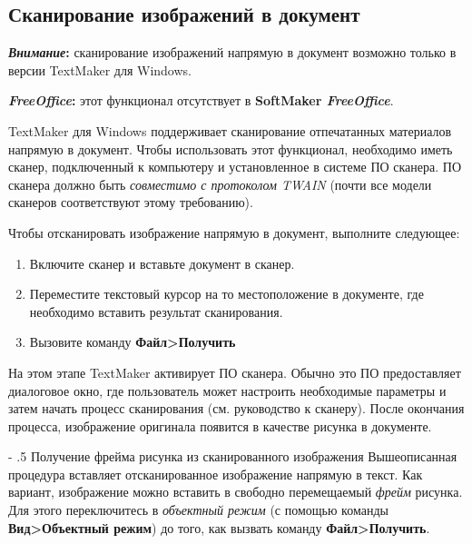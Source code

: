 \documentclass[a4paper,10pt]{article}
\makeatletter
\renewcommand\paragraph{%
   \@startsection{paragraph}{4}{0mm}%
      {-\baselineskip}%
      {.5\baselineskip}%
      {\normalfont\normalsize\bfseries}}
\makeatother
\begin{document}
\subsection{Сканирование изображений в документ}
\begin{mdframed}[backgroundcolor=blue!10]
\textbf{\textit{Внимание}:} сканирование изображений напрямую в документ возможно только в версии TextMaker для Windows.
\end{mdframed}

\begin{mdframed}[backgroundcolor=pink!50]
\textbf{\textit{FreeOffice}:} этот функционал отсутствует в \textbf{SoftMaker \textit{FreeOffice}}.
\end{mdframed}

TextMaker для Windows поддерживает сканирование отпечатанных материалов напрямую в документ. Чтобы использовать этот функционал, необходимо иметь сканер, подключенный к компьютеру и установленное в системе ПО сканера. ПО сканера должно быть \textit{совместимо с протоколом TWAIN} (почти все модели сканеров соответствуют этому требованию).

Чтобы отсканировать изображение напрямую в документ, выполните следующее:

\begin{enumerate}
 \item Включите сканер и вставьте документ в сканер.
 \item Переместите текстовый курсор на то местоположение в документе, где необходимо вставить результат сканирования.
 \item Вызовите команду \textbf{Файл>Получить}
\end{enumerate}

На этом этапе TextMaker активирует ПО сканера. Обычно это ПО предоставляет диалоговое окно, где пользователь может настроить необходимые параметры и затем начать процесс сканирования (см. руководство к сканеру). После окончания процесса, изображение оригинала появится в качестве рисунка в документе.

\paragraph{Получение фрейма рисунка из сканированного изображения}
Вышеописанная процедура вставляет отсканированное изображение напрямую в текст. Как вариант, изображение можно вставить в свободно перемещаемый \textit{фрейм} рисунка. Для этого переключитесь в \textit{объектный режим} (с помощью команды \textbf{Вид>Объектный режим}) до того, как вызвать команду \textbf{Файл>Получить}.
\end{document}
